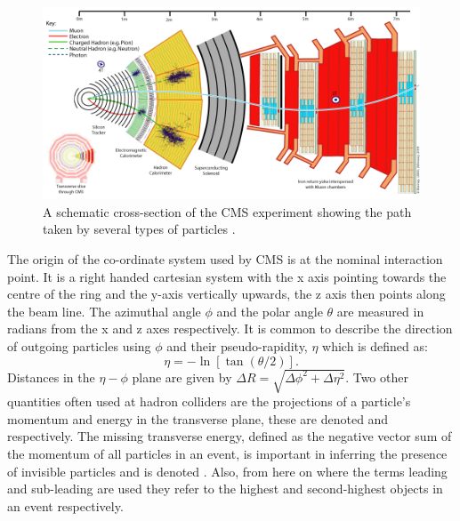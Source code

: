 \begin{figure}
  \includegraphics[width=1.2\largefigwidth]{plots/detector/CMS_Slice.png}
  \caption{A schematic cross-section of the CMS experiment showing the path taken by several types of particles \cite{CMSSlice}.}
  \label{fig:cmsschematic2}
\end{figure}

The origin of the co-ordinate system used by CMS is at the nominal interaction point. It is a right handed cartesian system with the x axis pointing towards the centre of the \LHC ring and the y-axis vertically upwards, the z axis then points along the beam line. The azimuthal angle $\phi$ and the polar angle $\theta$ are measured in radians from the x and z axes respectively. It is common to describe the direction of outgoing particles using $\phi$ and their pseudo-rapidity, $\eta$ which is defined as:
\begin{equation}
  \label{eq:eta}
  \eta=-\ln[\tan(\theta/2)].
\end{equation}
Distances in the $\eta-\phi$ plane are given by $\Delta R=\sqrt{\Delta\phi^2+\Delta\eta^2}$. Two other quantities often used at hadron colliders are the projections of a particle's momentum and energy in the transverse plane, these are denoted \pt and \Et respectively. The missing transverse energy, defined as the negative vector sum of the momentum of all particles in an event, is important in inferring the presence of invisible particles and is denoted \MET. Also, from here on where the terms leading and sub-leading are used they refer to the highest and second-highest \pt objects in an event respectively.

